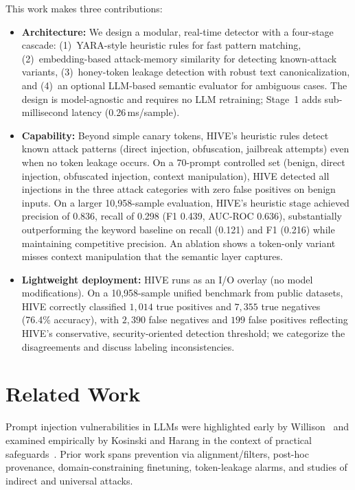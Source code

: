 \documentclass[manuscript,screen,review]{acmart}
\begin{document}
\noindent This work makes three contributions:
\begin{itemize}
    \item \textbf{Architecture:} We design a modular, real-time detector with a four-stage cascade: (1)~YARA-style heuristic rules for fast pattern matching, (2)~embedding-based attack-memory similarity for detecting known-attack variants, (3)~honey-token leakage detection with robust text canonicalization, and (4)~an optional LLM-based semantic evaluator for ambiguous cases. The design is model-agnostic and requires no LLM retraining; Stage~1 adds sub-millisecond latency (0.26\,ms/sample).
    \item \textbf{Capability:} Beyond simple canary tokens, HIVE's heuristic rules detect known attack patterns (direct injection, obfuscation, jailbreak attempts) even when no token leakage occurs. On a 70-prompt controlled set (benign, direct injection, obfuscated injection, context manipulation), HIVE detected all injections in the three attack categories with zero false positives on benign inputs. On a larger 10{,}958-sample evaluation, HIVE's heuristic stage achieved precision of 0.836, recall of 0.298 (F1 0.439, AUC-ROC 0.636), substantially outperforming the keyword baseline on recall (0.121) and F1 (0.216) while maintaining competitive precision. An ablation shows a token-only variant misses context manipulation that the semantic layer captures.
    \item \textbf{Lightweight deployment:} HIVE runs as an I/O overlay (no model modifications). On a 10{,}958-sample unified benchmark from public datasets, HIVE correctly classified \(1{,}014\) true positives and \(7{,}355\) true negatives (76.4\% accuracy), with \(2{,}390\) false negatives and \(199\) false positives reflecting HIVE's conservative, security-oriented detection threshold; we categorize the disagreements and discuss labeling inconsistencies.
\end{itemize}


\section{Related Work}
\label{sec:related-work}

Prompt injection vulnerabilities in LLMs were highlighted early by Willison~\cite{b5} and examined empirically by Kosinski and Harang in the context of practical safeguards~\cite{b9,b10}. Prior work spans prevention via alignment/filters, post-hoc provenance, domain-constraining finetuning, token-leakage alarms, and studies of indirect and universal attacks.
\end{document}
